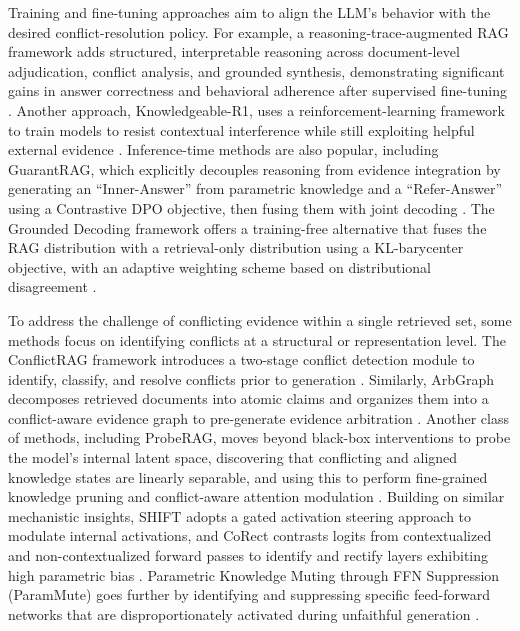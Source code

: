 \documentclass[11pt]{article}
\begin{document}
Training and fine-tuning approaches aim to align the LLM's behavior with the desired conflict-resolution policy. For example, a reasoning-trace-augmented RAG framework adds structured, interpretable reasoning across document-level adjudication, conflict analysis, and grounded synthesis, demonstrating significant gains in answer correctness and behavioral adherence after supervised fine-tuning \cite{ref180}. Another approach, Knowledgeable-R1, uses a reinforcement-learning framework to train models to resist contextual interference while still exploiting helpful external evidence \cite{ref181}. Inference-time methods are also popular, including GuarantRAG, which explicitly decouples reasoning from evidence integration by generating an ``Inner-Answer'' from parametric knowledge and a ``Refer-Answer'' using a Contrastive DPO objective, then fusing them with joint decoding \cite{ref179}. The Grounded Decoding framework offers a training-free alternative that fuses the RAG distribution with a retrieval-only distribution using a KL-barycenter objective, with an adaptive weighting scheme based on distributional disagreement \cite{ref182}.

To address the challenge of conflicting evidence within a single retrieved set, some methods focus on identifying conflicts at a structural or representation level. The ConflictRAG framework introduces a two-stage conflict detection module to identify, classify, and resolve conflicts prior to generation \cite{ref183}. Similarly, ArbGraph decomposes retrieved documents into atomic claims and organizes them into a conflict-aware evidence graph to pre-generate evidence arbitration \cite{ref184}. Another class of methods, including ProbeRAG, moves beyond black-box interventions to probe the model's internal latent space, discovering that conflicting and aligned knowledge states are linearly separable, and using this to perform fine-grained knowledge pruning and conflict-aware attention modulation \cite{ref185}. Building on similar mechanistic insights, SHIFT adopts a gated activation steering approach to modulate internal activations, and CoRect contrasts logits from contextualized and non-contextualized forward passes to identify and rectify layers exhibiting high parametric bias \cite{ref186,ref187}. Parametric Knowledge Muting through FFN Suppression (ParamMute) goes further by identifying and suppressing specific feed-forward networks that are disproportionately activated during unfaithful generation \cite{ref188}.
\end{document}
